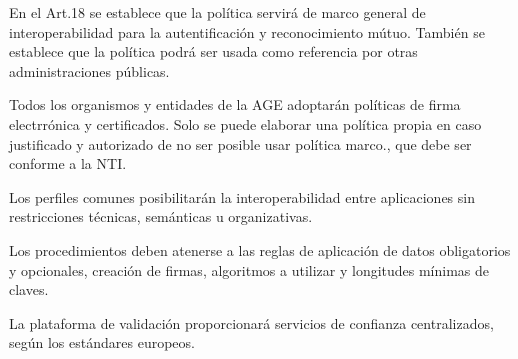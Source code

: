         En el Art.18 se establece que la política servirá de marco general de interoperabilidad para la autentificación y reconocimiento mútuo. También se establece que la política podrá ser usada como referencia por otras administraciones públicas.

        Todos los organismos y entidades de la AGE adoptarán políticas de firma electrrónica y certificados. Solo se puede elaborar una política propia en caso justificado y autorizado de no ser posible usar política marco., que debe ser conforme a la NTI.

        Los perfiles comunes posibilitarán la interoperabilidad entre aplicaciones sin restricciones técnicas, semánticas u organizativas.

        Los procedimientos deben atenerse a las reglas de aplicación de datos obligatorios y opcionales, creación de firmas, algoritmos a utilizar y longitudes mínimas de claves.

        La plataforma de validación proporcionará servicios de confianza centralizados, según los estándares europeos.

